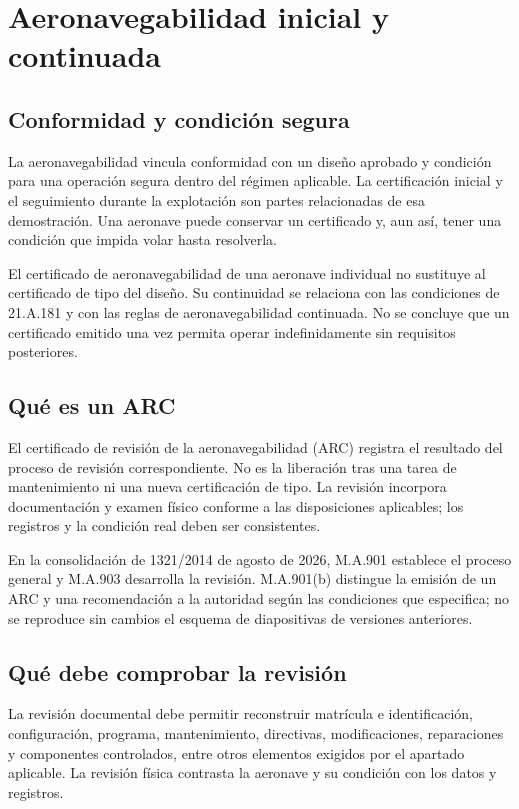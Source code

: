 \chapter{Aeronavegabilidad inicial y continuada}\label{ch:16}
\section{Conformidad y condición segura}
La aeronavegabilidad vincula conformidad con un diseño aprobado y condición para una operación segura dentro del régimen aplicable. La certificación inicial y el seguimiento durante la explotación son partes relacionadas de esa demostración. Una aeronave puede conservar un certificado y, aun así, tener una condición que impida volar hasta resolverla.

El certificado de aeronavegabilidad de una aeronave individual no sustituye al certificado de tipo del diseño. Su continuidad se relaciona con las condiciones de 21.A.181 y con las reglas de aeronavegabilidad continuada. No se concluye que un certificado emitido una vez permita operar indefinidamente sin requisitos posteriores.
\section{Qué es un ARC}
El certificado de revisión de la aeronavegabilidad (ARC) registra el resultado del proceso de revisión correspondiente. No es la liberación tras una tarea de mantenimiento ni una nueva certificación de tipo. La revisión incorpora documentación y examen físico conforme a las disposiciones aplicables; los registros y la condición real deben ser consistentes.

En la consolidación de 1321/2014 de agosto de 2026, M.A.901 establece el proceso general y M.A.903 desarrolla la revisión. M.A.901(b) distingue la emisión de un ARC y una recomendación a la autoridad según las condiciones que especifica; no se reproduce sin cambios el esquema de diapositivas de versiones anteriores.
\section{Qué debe comprobar la revisión}
La revisión documental debe permitir reconstruir matrícula e identificación, configuración, programa, mantenimiento, directivas, modificaciones, reparaciones y componentes controlados, entre otros elementos exigidos por el apartado aplicable. La revisión física contrasta la aeronave y su condición con los datos y registros.

